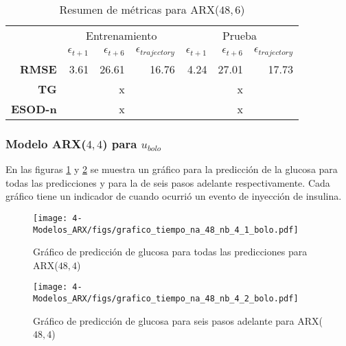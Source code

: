 \begin{table}[H]
	\centering
	\begin{tabular}{rrrr|rrr}
		\hline \hline
		& \multicolumn{3}{c|}{Entrenamiento} & \multicolumn{3}{c}{Prueba} \\
		& $\epsilon_{t+1}$ & $\epsilon_{t+6}$ &$\epsilon_{trajectory}$ & $\epsilon_{t+1}$  & $\epsilon_{t+6}$ & $\epsilon_{trajectory}$ \\ \hline
		\textbf{RMSE}   & 3.61 & 26.61 & 16.76 & 4.24 & 27.01 & 17.73 \\
		\textbf{TG}     &      & x     &       &      & x     &       \\
		\textbf{ESOD-n} &      & x     &       &      & x     &       \\ 
		\hline \hline
	\end{tabular}
	\caption{Resumen de métricas para ARX($48, 6$)}
	\label{table:M4_metricas_meal}
\end{table}
















\subsubsection{Modelo ARX($4,4$) para $u_{bolo}$}

En las figuras \ref{fig:M4_grafico_tiempo_1_bolo} y \ref{fig:M4_grafico_tiempo_2_bolo} se muestra un gráfico para la predicción de la glucosa para todas las predicciones y para la de seis pasos adelante respectivamente. Cada gráfico tiene un indicador de cuando ocurrió un evento de inyección de insulina.

\begin{figure}[H]
	\centering
	\texttt{[image: 4-Modelos\_ARX/figs/grafico\_tiempo\_na\_48\_nb\_4\_1\_bolo.pdf]}
	\caption{Gráfico de predicción de glucosa para todas las predicciones para ARX($48, 4$)}
	\label{fig:M4_grafico_tiempo_1_bolo}
\end{figure}

\begin{figure}[H]
	\centering
	\texttt{[image: 4-Modelos\_ARX/figs/grafico\_tiempo\_na\_48\_nb\_4\_2\_bolo.pdf]}
	\caption{Gráfico de predicción de glucosa para seis pasos adelante para ARX($48, 4$)}
	\label{fig:M4_grafico_tiempo_2_bolo}
\end{figure}


